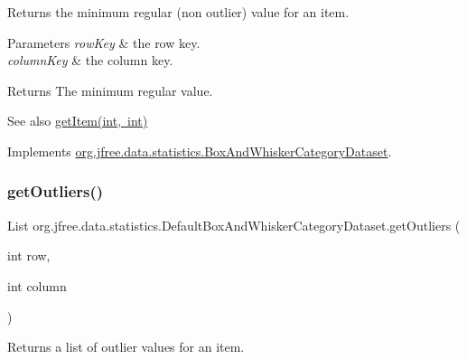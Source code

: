 Returns the minimum regular (non outlier) value for an item.


\begin{DoxyParams}{Parameters}
{\em row\+Key} & the row key. \\
\hline
{\em column\+Key} & the column key.\\
\hline
\end{DoxyParams}
\begin{DoxyReturn}{Returns}
The minimum regular value.
\end{DoxyReturn}
\begin{DoxySeeAlso}{See also}
\mbox{\hyperlink{classorg_1_1jfree_1_1data_1_1statistics_1_1_default_box_and_whisker_category_dataset_a85c944b06e4337059ea728b3a744e2a9}{get\+Item(int, int)}} 
\end{DoxySeeAlso}


Implements \mbox{\hyperlink{interfaceorg_1_1jfree_1_1data_1_1statistics_1_1_box_and_whisker_category_dataset_afadbc2ab28bb51815ab80b002177894e}{org.\+jfree.\+data.\+statistics.\+Box\+And\+Whisker\+Category\+Dataset}}.

\mbox{\label{classorg_1_1jfree_1_1data_1_1statistics_1_1_default_box_and_whisker_category_dataset_a25d77e5239cf4b5619fbdca15ef65152}} 
\subsubsection{\texorpdfstring{get\+Outliers()}{getOutliers()}\hspace{0.1cm}{\footnotesize\ttfamily [1/2]}}
{\footnotesize\ttfamily List org.\+jfree.\+data.\+statistics.\+Default\+Box\+And\+Whisker\+Category\+Dataset.\+get\+Outliers (\begin{DoxyParamCaption}\item[{int}]{row,  }\item[{int}]{column }\end{DoxyParamCaption})}

Returns a list of outlier values for an item.


